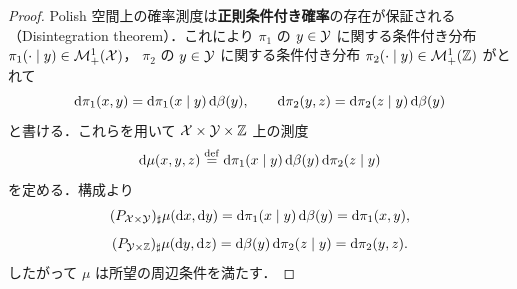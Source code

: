 \begin{proof}
  Polish 空間上の確率測度は\textbf{正則条件付き確率}の存在が保証される
  （Disintegration theorem）．これにより
  $\pi_1$ の $y \in \mathcal{Y}$ に関する条件付き分布 $\pi_1(\cdot \mid y) \in \mathcal{M}_+^1(\mathcal{X})$，
  $\pi_2$ の $y \in \mathcal{Y}$ に関する条件付き分布 $\pi_2(\cdot \mid y) \in \mathcal{M}_+^1(\mathbb{Z})$
  がとれて
  \[
    \mathrm{d}\pi_1(x, y) = \mathrm{d}\pi_1(x \mid y) \, \mathrm{d}\beta(y),
    \qquad
    \mathrm{d}\pi_2(y, z) = \mathrm{d}\pi_2(z \mid y) \, \mathrm{d}\beta(y)
  \]
  と書ける．これらを用いて $\mathcal{X} \times \mathcal{Y} \times \mathbb{Z}$ 上の測度
  \[
    \mathrm{d}\mu(x, y, z) \overset{\mathrm{def}}{=} \mathrm{d}\pi_1(x \mid y) \, \mathrm{d}\beta(y) \, \mathrm{d}\pi_2(z \mid y)
  \]
  を定める．構成より
  \[
    (P_{\mathcal{X} \times \mathcal{Y}})_\sharp \mu(\mathrm{d} x, \mathrm{d} y)
    = \mathrm{d}\pi_1(x \mid y) \, \mathrm{d}\beta(y)
    = \mathrm{d}\pi_1(x, y),
  \]
  \[
    (P_{\mathcal{Y} \times \mathbb{Z}})_\sharp \mu(\mathrm{d} y, \mathrm{d} z)
    = \mathrm{d}\beta(y) \, \mathrm{d}\pi_2(z \mid y)
    = \mathrm{d}\pi_2(y, z).
  \]
  したがって $\mu$ は所望の周辺条件を満たす．
\end{proof}

